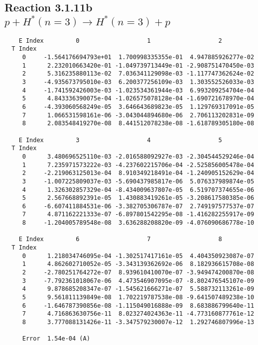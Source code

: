 \documentclass[12pt]{article}
\begin{document}
                               


\newpage
\subsection{
Reaction 3.1.11b $  p + H^*(n=3) \rightarrow H^*(n=3) + p$}


\begin{small}\begin{verbatim}
    E Index         0                   1                   2
  T Index
     0     -1.564176694793e+01  1.700998335355e-01  4.947885926277e-02
     1      2.232010663420e-01 -1.049739713449e-01 -2.908751470450e-03
     2      5.316235880113e-02  7.036341129098e-03 -1.117747362624e-02
     3     -4.935673795010e-03  6.200377256109e-03  1.303552526033e-03
     4     -1.741592426003e-03 -1.023534361944e-03  6.993209254704e-04
     5      4.843336390075e-04 -1.026575078128e-04 -1.690721678970e-04
     6     -4.393060568249e-05  3.646643689823e-05  1.129769317091e-05
     7      1.066531598161e-06 -3.043044894680e-06  2.706113202831e-09
     8      2.083548419270e-08  8.441512078238e-08 -1.618789305180e-08

    E Index         3                   4                   5
  T Index
     0      3.480696525110e-03 -2.016588092927e-03 -2.304544529246e-04
     1      7.235971573222e-03 -4.237602215706e-04 -2.525856005478e-04
     2     -2.219063125013e-04  8.910349218491e-04 -1.240905152629e-04
     3     -1.007225809037e-03 -5.690437985817e-06  5.076337989874e-05
     4      1.326302857329e-04 -8.434009637807e-05  6.519707374655e-06
     5      2.567668892391e-05  1.430883419261e-05 -3.208617580385e-06
     6     -6.607411884531e-06 -3.382705306787e-07  2.749197577537e-07
     7      4.871162221333e-07 -6.897801542295e-08 -1.416282255917e-09
     8     -1.204005789548e-08  3.636288208820e-09 -4.076090686778e-10

    E Index         6                   7                   8
  T Index
     0      1.218034746095e-04 -1.302517417161e-05  4.404350923087e-07
     1      4.862602710052e-05 -3.343139362692e-06  8.182936615708e-08
     2     -2.780251764272e-07  8.939610410070e-07 -3.949474200870e-08
     3     -7.792361018067e-06  4.473546907095e-07 -8.802476545107e-09
     4      9.878685208347e-07 -1.545621666271e-07  5.588732113261e-09
     5      9.561811139849e-08  1.702219787538e-08 -9.641507489238e-10
     6     -1.646787390856e-08 -1.115049016888e-09  8.683886799640e-11
     7      4.716863630756e-11  8.023274024363e-11 -4.773160877761e-12
     8      3.777088131426e-11 -3.347579230007e-12  1.292746807996e-13

     Error  1.54e-04 (A)
\end{verbatim}\end{small}
\end{document}
